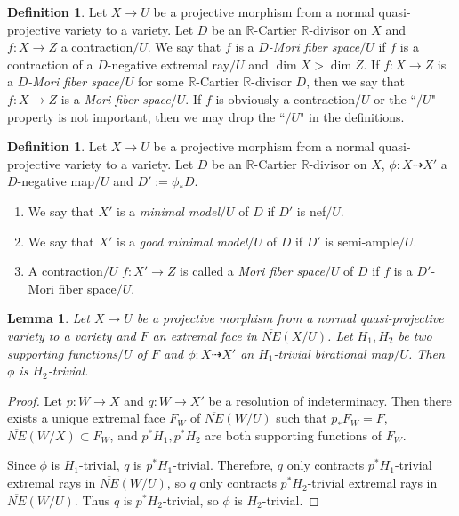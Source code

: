 \documentclass[11pt]{amsart}
\numberwithin{equation}{section}
\newcommand{\Rr}{\mathbb{R}}
\newtheorem{lem}[thm]{Lemma}
\theoremstyle{definition}
\newtheorem{defn}[thm]{Definition}
\theoremstyle{definition}
\theoremstyle{definition}
\begin{document}
\begin{defn}
    Let $X\rightarrow U$ be a projective morphism from a normal quasi-projective variety to a variety. Let $D$ be an $\Rr$-Cartier $\Rr$-divisor on $X$ and $f: X\rightarrow Z$ a contraction$/U$.  We say that $f$ is a \emph{$D$-Mori fiber space$/U$} if $f$ is a contraction of a $D$-negative extremal ray$/U$ and $\dim X>\dim Z$. If $f: X\rightarrow Z$ is a \emph{$D$-Mori fiber space$/U$} for some $\Rr$-Cartier $\Rr$-divisor $D$, then we say that $f: X\rightarrow Z$ is a \emph{Mori fiber space$/U$}. If $f$ is obviously a contraction$/U$ or the ``$/U$" property is not important, then we may drop the ``$/U$" in the definitions.
\end{defn}

\begin{defn} Let $X\rightarrow U$ be a projective morphism from a normal quasi-projective variety to a variety. Let $D$ be an $\Rr$-Cartier $\Rr$-divisor on $X$, $\phi: X\dashrightarrow X'$ a $D$-negative map$/U$ and $D':=\phi_*D$.
\begin{enumerate}
\item We say that $X'$ is a \emph{minimal model}$/U$ of $D$ if $D'$ is nef$/U$.
\item We say that $X'$ is a \emph{good minimal model}$/U$ of $D$ if $D'$ is semi-ample$/U$.
\item A contraction$/U$ $f: X'\rightarrow Z$ is called a \emph{Mori fiber space}$/U$ of $D$ if $f$ is a $D'$-Mori fiber space$/U$.
\end{enumerate}
\end{defn}



\begin{lem}\label{lem: two supporting function trivial}
Let $X\rightarrow U$ be a projective morphism from a normal quasi-projective variety to a variety and $F$ an extremal face in $\overline{NE}(X/U)$. Let $H_1,H_2$ be two supporting functions$/U$ of $F$ and $\phi: X\dashrightarrow X'$ an $H_1$-trivial birational map$/U$. Then $\phi$ is $H_2$-trivial.
\end{lem}
\begin{proof}
    Let $p: W\rightarrow X$ and $q: W\rightarrow X'$ be a resolution of indeterminacy. Then there exists a unique extremal face $F_W$ of $\overline{NE}(W/U)$ such that $p_*F_W=F$, $\overline{NE}(W/X)\subset F_W$, and $p^*H_1,p^*H_2$ are both supporting functions of $F_W$. 

    Since $\phi$ is $H_1$-trivial, $q$ is $p^*H_1$-trivial. Therefore, $q$ only contracts $p^*H_1$-trivial extremal rays in $\overline{NE}(W/U)$, so $q$ only contracts $p^*H_2$-trivial extremal rays in $\overline{NE}(W/U)$. Thus $q$ is $p^*H_2$-trivial, so $\phi$ is $H_2$-trivial.
\end{proof}
\end{document}
